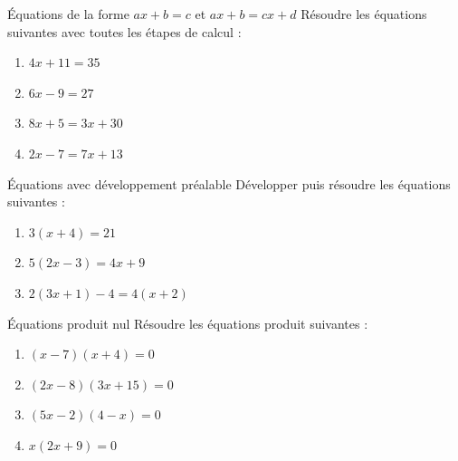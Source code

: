 \begin{exercice}[3 pts]{\capRealiser}{Équations de la forme $ax+b=c$ et $ax+b=cx+d$}
Résoudre les équations suivantes avec toutes les étapes de calcul :
\begin{enumerate}
    \item $4x + 11 = 35$
    \item $6x - 9 = 27$
    \item $8x + 5 = 3x + 30$
    \item $2x - 7 = 7x + 13$
\end{enumerate}
\lignesreponse[6]
\end{exercice}

\begin{exercice}[3 pts]{\capRealiser}{Équations avec développement préalable}
Développer puis résoudre les équations suivantes :
\begin{enumerate}
    \item $3(x + 4) = 21$
    \item $5(2x - 3) = 4x + 9$
    \item $2(3x + 1) - 4 = 4(x + 2)$
\end{enumerate}
\lignesreponse[6]
\end{exercice}

\begin{exercice}[3 pts]{\capRealiser}{Équations produit nul}
Résoudre les équations produit suivantes :
\begin{enumerate}
    \item $(x - 7)(x + 4) = 0$
    \item $(2x - 8)(3x + 15) = 0$
    \item $(5x - 2)(4 - x) = 0$
    \item $x(2x + 9) = 0$
\end{enumerate}
\lignesreponse[6]
\end{exercice}

